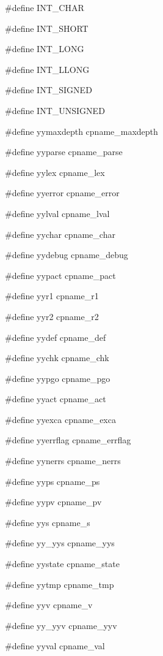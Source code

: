 \medskip
{\stt \#define INT\_CHAR}

\medskip
{\stt \#define INT\_SHORT}

\medskip
{\stt \#define INT\_LONG}

\medskip
{\stt \#define INT\_LLONG}

\medskip
{\stt \#define INT\_SIGNED}

\medskip
{\stt \#define INT\_UNSIGNED}

\medskip
{\stt \#define yymaxdepth cpname\_maxdepth}

\medskip
{\stt \#define yyparse cpname\_parse}

\medskip
{\stt \#define yylex cpname\_lex}

\medskip
{\stt \#define yyerror cpname\_error}

\medskip
{\stt \#define yylval cpname\_lval}

\medskip
{\stt \#define yychar cpname\_char}

\medskip
{\stt \#define yydebug cpname\_debug}

\medskip
{\stt \#define yypact cpname\_pact}

\medskip
{\stt \#define yyr1 cpname\_r1}

\medskip
{\stt \#define yyr2 cpname\_r2}

\medskip
{\stt \#define yydef cpname\_def}

\medskip
{\stt \#define yychk cpname\_chk}

\medskip
{\stt \#define yypgo cpname\_pgo}

\medskip
{\stt \#define yyact cpname\_act}

\medskip
{\stt \#define yyexca cpname\_exca}

\medskip
{\stt \#define yyerrflag cpname\_errflag}

\medskip
{\stt \#define yynerrs cpname\_nerrs}

\medskip
{\stt \#define yyps cpname\_ps}

\medskip
{\stt \#define yypv cpname\_pv}

\medskip
{\stt \#define yys cpname\_s}

\medskip
{\stt \#define yy\_yys cpname\_yys}

\medskip
{\stt \#define yystate cpname\_state}

\medskip
{\stt \#define yytmp cpname\_tmp}

\medskip
{\stt \#define yyv cpname\_v}

\medskip
{\stt \#define yy\_yyv cpname\_yyv}

\medskip
{\stt \#define yyval cpname\_val}

